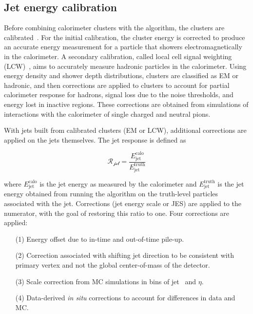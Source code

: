 \subsection{Jet energy calibration}

Before combining calorimeter clusters with the \antikt algorithm, the
clusters are calibrated~\cite{bib:Aad:2014bia}. For the initial
calibration, the cluster energy is corrected to produce an accurate
energy measurement for a particle that showers electromagnetically in
the calorimeter. A secondary calibration, called local cell signal
weighting (LCW)~\cite{bib:Cojocaru:2004jk}, aims to accurately measure hadronic particles in the
calorimeter. Using energy density and shower depth distributions,
clusters are classified as EM or hadronic, and then corrections are
applied to clusters to account for partial calorimeter response for hadrons,
signal loss due to the noise thresholds, and energy lost in inactive
regions. These corrections are obtained from simulations of
interactions with the calorimeter of single charged and neutral pions.

With jets built from calibrated clusters (EM or LCW), additional
corrections are applied on the jets themselves. The jet response is
defined as 

\begin{equation}
\mathscr{R_{\textrm{jet}}} = \frac{E^{\textrm{calo}}_{\textrm{jet}}}{E^{\textrm{truth}}_{\textrm{jet}}}
\end{equation}

\noindent 
where $E^{\textrm{calo}}_{\textrm{jet}}$ is the jet energy as measured
by the calorimeter and $E^{\textrm{truth}}_{\textrm{jet}}$ is the jet
energy obtained from running the \antikt algorithm on the truth-level
particles associated with the jet. Corrections (jet energy scale or JES) are
applied to the numerator, with the goal of restoring this ratio to
one. Four corrections are applied:

\begin{enumerate}[nolistsep]
\item[(1)] Energy offset due to in-time and out-of-time pile-up.
\item[(2)] Correction associated with shifting jet direction to be
consistent with primary vertex and not the global center-of-mass of the
detector.
\item[(3)] Scale correction from MC simulations in bins of jet \pt~and
$\eta$.
\item[(4)] Data-derived {\it in situ} corrections to account for
differences in data and MC.
\end{enumerate}

